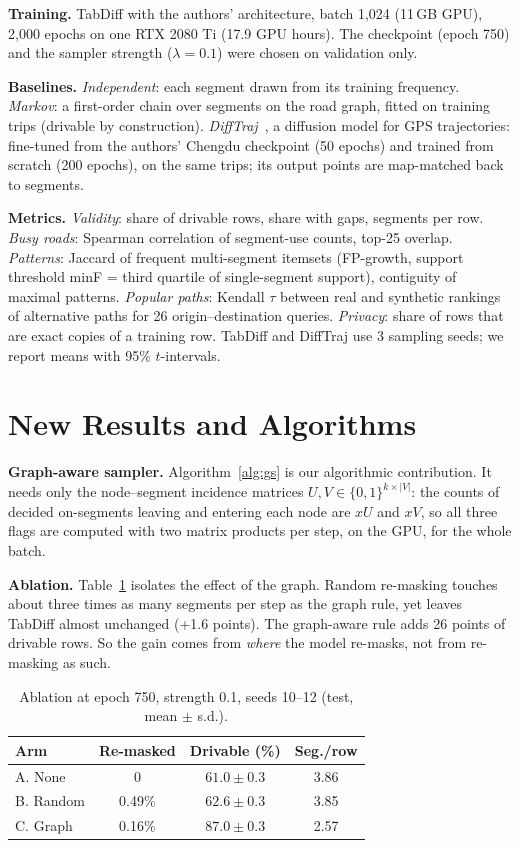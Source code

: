 \documentclass[10pt,twocolumn,a4paper]{article}
\begin{document}
\textbf{Training.} TabDiff with the authors' architecture, batch 1,024 (11\,GB GPU), 2,000 epochs on one RTX
2080 Ti (17.9 GPU hours). The checkpoint (epoch 750) and the sampler strength ($\lambda=0.1$) were chosen on
validation only.

\textbf{Baselines.}
\emph{Independent}: each segment drawn from its training frequency.
\emph{Markov}: a first-order chain over segments on the road graph, fitted on training trips (drivable by
construction).
\emph{DiffTraj}~\cite{difftraj}, a diffusion model for GPS trajectories: fine-tuned from the authors'
Chengdu checkpoint (50 epochs) and trained from scratch (200 epochs), on the same trips; its output points
are map-matched back to segments.

\textbf{Metrics.} \emph{Validity}: share of drivable rows, share with gaps, segments per row.
\emph{Busy roads}: Spearman correlation of segment-use counts, top-25 overlap. \emph{Patterns}: Jaccard of
frequent multi-segment itemsets (FP-growth, support threshold minF = third quartile of single-segment
support), contiguity of maximal patterns. \emph{Popular paths}: Kendall $\tau$ between real and synthetic
rankings of alternative paths for 26 origin--destination queries. \emph{Privacy}: share of rows that are
exact copies of a training row. TabDiff and DiffTraj use 3 sampling seeds; we report means with 95\%
$t$-intervals.

\section{New Results and Algorithms}
\label{sec:h}
\textbf{Graph-aware sampler.} Algorithm~\ref{alg:gs} is our algorithmic contribution. It needs only the
node--segment incidence matrices $U,V\in\{0,1\}^{k\times|V|}$: the counts of decided on-segments leaving and
entering each node are $xU$ and $xV$, so all three flags are computed with two matrix products per step,
on the GPU, for the whole batch.

\textbf{Ablation.} Table~\ref{tab:abl} isolates the effect of the graph. Random re-masking touches about
three times as many segments per step as the graph rule, yet leaves TabDiff almost unchanged
(+1.6 points). The graph-aware rule adds 26 points of drivable rows. So the gain comes from
\emph{where} the model re-masks, not from re-masking as such.

\begin{table}[h]
\centering
\caption{Ablation at epoch 750, strength 0.1, seeds 10--12 (test, mean $\pm$ s.d.).}
\label{tab:abl}
\small
\begin{tabular}{lccc}
\toprule
Arm & Re-masked & Drivable (\%) & Seg./row \\
\midrule
A. None & 0 & $61.0\pm0.3$ & 3.86 \\
B. Random & 0.49\% & $62.6\pm0.3$ & 3.85 \\
C. Graph & 0.16\% & $87.0\pm0.3$ & 2.57 \\
\bottomrule
\end{tabular}
\end{table}
\end{document}
